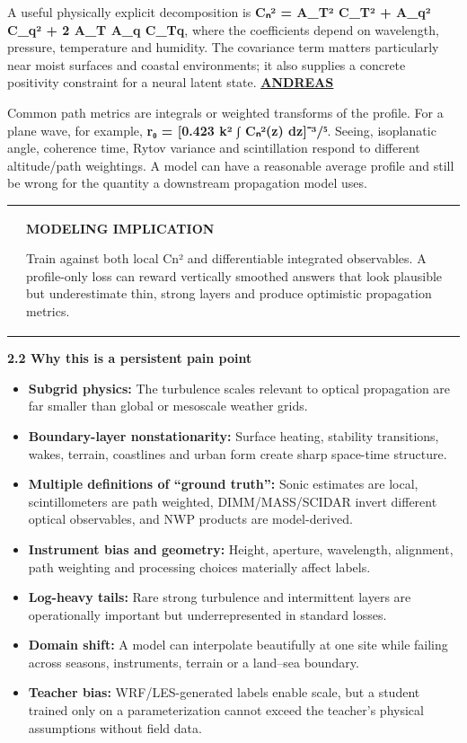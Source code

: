 \documentclass[
]{article}
\begin{document}
A useful physically explicit decomposition is \textbf{Cₙ² = A\_T² C\_T²
+ A\_q² C\_q² + 2 A\_T A\_q C\_Tq}, where the coefficients depend on
wavelength, pressure, temperature and humidity. The covariance term
matters particularly near moist surfaces and coastal environments; it
also supplies a concrete positivity constraint for a neural latent
state.
\href{https://opg.optica.org/abstract.cfm?uri=josaa-5-4-481}{\textbf{\ul{ANDREAS}}}

Common path metrics are integrals or weighted transforms of the profile.
For a plane wave, for example, \textbf{r₀ = {[}0.423 k² ∫ Cₙ²(z)
dz{]}⁻³/⁵}. Seeing, isoplanatic angle, coherence time, Rytov variance
and scintillation respond to different altitude/path weightings. A model
can have a reasonable average profile and still be wrong for the
quantity a downstream propagation model uses.

\begin{longtable}[]{@{}
  >{\raggedright\arraybackslash}p{}
  >{\raggedright\arraybackslash}p{}@{}}
\toprule\noalign{}
\endhead
\bottomrule\noalign{}
\endlastfoot
& \textbf{MODELING IMPLICATION}

Train against both local Cn² and differentiable integrated observables.
A profile-only loss can reward vertically smoothed answers that look
plausible but underestimate thin, strong layers and produce optimistic
propagation metrics. \\
\end{longtable}

\textbf{2.2 Why this is a persistent pain point}

\begin{itemize}
\item
  \textbf{Subgrid physics:} The turbulence scales relevant to optical
  propagation are far smaller than global or mesoscale weather grids.
\item
  \textbf{Boundary-layer nonstationarity:} Surface heating, stability
  transitions, wakes, terrain, coastlines and urban form create sharp
  space-time structure.
\item
  \textbf{Multiple definitions of ``ground truth'':} Sonic estimates are
  local, scintillometers are path weighted, DIMM/MASS/SCIDAR invert
  different optical observables, and NWP products are model-derived.
\item
  \textbf{Instrument bias and geometry:} Height, aperture, wavelength,
  alignment, path weighting and processing choices materially affect
  labels.
\item
  \textbf{Log-heavy tails:} Rare strong turbulence and intermittent
  layers are operationally important but underrepresented in standard
  losses.
\item
  \textbf{Domain shift:} A model can interpolate beautifully at one site
  while failing across seasons, instruments, terrain or a land--sea
  boundary.
\item
  \textbf{Teacher bias:} WRF/LES-generated labels enable scale, but a
  student trained only on a parameterization cannot exceed the teacher's
  physical assumptions without field data.
\end{itemize}
\end{document}
